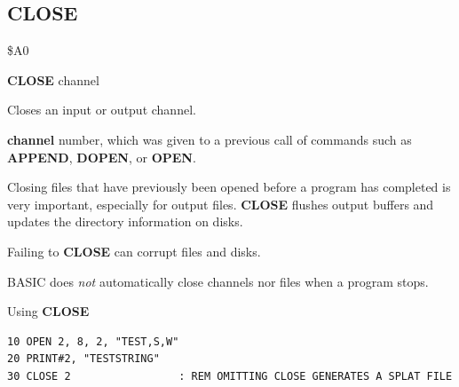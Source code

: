 \subsection{CLOSE}
\begin{description}[leftmargin=2cm,style=nextline]
\item [Token:]   \$A0

\item [Format:]  {\bf CLOSE} channel

\item [Usage:]   Closes an input or output channel.

                 {\bf channel} number, which was given to a previous call of commands such as {\bf APPEND}, {\bf DOPEN}, or {\bf OPEN}.

\item [Remarks:] Closing files that have previously been opened before a program has completed is very important, especially for output files.
                 {\bf CLOSE} flushes output buffers and updates the directory information on disks.

                 Failing to {\bf CLOSE} can corrupt files and disks.

                 BASIC does {\em not} automatically close channels nor files when a program stops.

\item [Example:] Using {\bf CLOSE}

\begin{tcolorbox}[colback=black,coltext=white]
\verbatimfont{\codefont}
\begin{verbatim}
10 OPEN 2, 8, 2, "TEST,S,W"
20 PRINT#2, "TESTSTRING"
30 CLOSE 2                 : REM OMITTING CLOSE GENERATES A SPLAT FILE
\end{verbatim}
\end{tcolorbox}
\end{description}


\newpage
